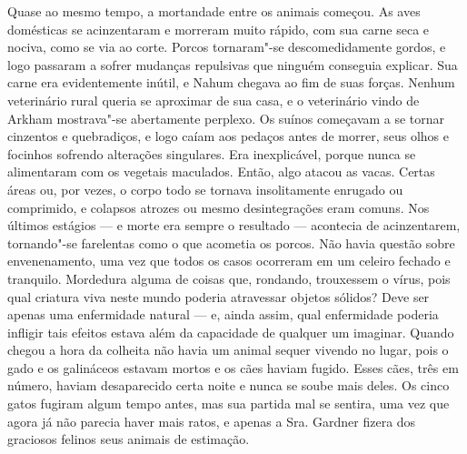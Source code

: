 Quase ao mesmo tempo, a mortandade entre os animais começou. As aves
domésticas se acinzentaram e morreram muito rápido, com sua carne seca e
nociva, como se via ao corte. Porcos tornaram"-se descomedidamente
gordos, e logo passaram a sofrer mudanças repulsivas que ninguém
conseguia explicar. Sua carne era evidentemente inútil, e Nahum chegava
ao fim de suas forças. Nenhum veterinário rural queria se aproximar de
sua casa, e o veterinário vindo de Arkham mostrava"-se abertamente
perplexo. Os suínos começavam a se tornar cinzentos e quebradiços, e
logo caíam aos pedaços antes de morrer, seus olhos e focinhos sofrendo
alterações singulares. Era inexplicável, porque nunca se alimentaram com
os vegetais maculados. Então, algo atacou as vacas. Certas áreas ou, por
vezes, o corpo todo se tornava insolitamente enrugado ou comprimido, e
colapsos atrozes ou mesmo desintegrações eram comuns. Nos últimos
estágios --- e morte era sempre o
resultado --- acontecia de acinzentarem, tornando"-se farelentas como o
que acometia os porcos. Não havia questão sobre envenenamento, uma vez
que todos os casos ocorreram em um celeiro fechado e tranquilo.
Mordedura alguma de coisas que, rondando, trouxessem o vírus, pois qual
criatura viva neste mundo poderia atravessar objetos sólidos? Deve ser
apenas uma enfermidade natural --- e, ainda assim, qual enfermidade
poderia infligir tais efeitos estava além da capacidade de qualquer um
imaginar. Quando chegou a hora da colheita não havia um animal sequer
vivendo no lugar, pois o gado e os galináceos estavam mortos e os cães
haviam fugido. Esses cães, três em número, haviam desaparecido certa
noite e nunca se soube mais deles. Os cinco gatos fugiram algum tempo
antes, mas sua partida mal se sentira, uma vez que agora já não parecia
haver mais ratos, e apenas a Sra. Gardner fizera dos graciosos felinos
seus animais de estimação.

